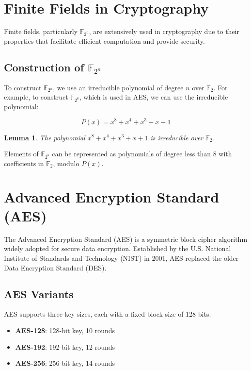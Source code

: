 \documentclass[11pt]{article}
\newtheorem{lemma}{Lemma}
\begin{document}
\section{Finite Fields in Cryptography}

Finite fields, particularly $\mathbb{F}_{2^n}$, are extensively used in cryptography due to their properties that facilitate efficient computation and provide security.

\subsection{Construction of $\mathbb{F}_{2^n}$}

To construct $\mathbb{F}_{2^n}$, we use an irreducible polynomial of degree $n$ over $\mathbb{F}_2$. For example, to construct $\mathbb{F}_{2^8}$, which is used in AES, we can use the irreducible polynomial:

\[ P(x) = x^8 + x^4 + x^3 + x + 1 \]

\begin{lemma}
The polynomial $x^8 + x^4 + x^3 + x + 1$ is irreducible over $\mathbb{F}_2$.
\end{lemma}

Elements of $\mathbb{F}_{2^8}$ can be represented as polynomials of degree less than 8 with coefficients in $\mathbb{F}_2$, modulo $P(x)$.

\section{Advanced Encryption Standard (AES)}

The Advanced Encryption Standard (AES) is a symmetric block cipher algorithm widely adopted for secure data encryption. Established by the U.S. National Institute of Standards and Technology (NIST) in 2001, AES replaced the older Data Encryption Standard (DES).

\subsection{AES Variants}

AES supports three key sizes, each with a fixed block size of 128 bits:

\begin{tcolorbox}
\begin{itemize}
    \item \textbf{AES-128}: 128-bit key, 10 rounds
    \item \textbf{AES-192}: 192-bit key, 12 rounds
    \item \textbf{AES-256}: 256-bit key, 14 rounds
\end{itemize}
\end{tcolorbox}
\end{document}
